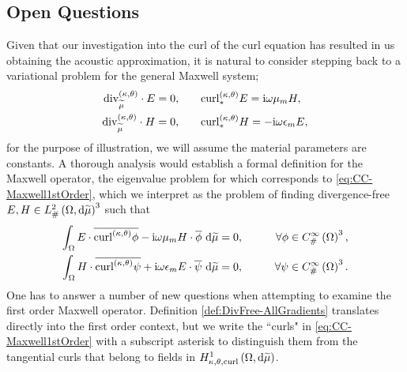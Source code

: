 \subsection{Open Questions} \label{ssec:CC-OpenQuestions}

Given that our investigation into the curl of the curl equation has resulted in us obtaining the acoustic approximation, it is natural to consider stepping back to a variational problem for the general Maxwell system;
\begin{subequations} \label{eq:CC-Maxwell1stOrder}
	\begin{align}
		\mathrm{div}_{\widetilde{\mu}}^{\left( \kappa, \theta \right)}\cdot E = 0,
		&\qquad
		\mathrm{curl}_{*}^{\left( \kappa, \theta \right)}E = \mathrm{i}\omega\mu_m H, \\
		\mathrm{div}_{\widetilde{\mu}}^{\left( \kappa, \theta \right)}\cdot H = 0,
		&\qquad
		\mathrm{curl}_{*}^{\left( \kappa, \theta \right)}H = -\mathrm{i}\omega\epsilon_m E,
	\end{align}
\end{subequations}
for the purpose of illustration, we will assume the material parameters are constants. 
A thorough analysis would establish a formal definition for the Maxwell operator, the eigenvalue problem for which corresponds to \eqref{eq:CC-Maxwell1stOrder}, which we interpret as the problem of finding divergence-free $E,H\in L^2_{\#}\left( \Omega,\mathrm{d} \widetilde{\mu} \right)^3$ such that
\begin{subequations} \label{eq:CC-Maxwell1stOrderVariational}
	\begin{align} 
		\int_{\Omega} E\cdot\overline{\mathrm{curl}_{}^{\left( \kappa, \theta \right)}\phi} - \mathrm{i}\omega\mu_m H\cdot\overline{\phi}  \ \mathrm{d}\widetilde{\mu} &= 0, 
		\qquad &\forall \phi\in C^{\infty}_{\#}\left( \Omega \right)^3, \\
		\int_{\Omega} H\cdot\overline{\mathrm{curl}_{}^{\left( \kappa, \theta \right)}\psi} + \mathrm{i}\omega\epsilon_m E\cdot\overline{\psi}  \ \mathrm{d}\widetilde{\mu} &= 0,
		\qquad &\forall \psi\in C^{\infty}_{\#}\left( \Omega \right)^3.
	\end{align}
\end{subequations}
One has to answer a number of new questions when attempting to examine the first order Maxwell operator.
Definition \ref{def:DivFree-AllGradients} translates directly into the first order context, but we write the ``curls" in \eqref{eq:CC-Maxwell1stOrder} with a subscript asterisk to distinguish them from the tangential curls that belong to fields in $H^1_{\kappa,\theta,\mathrm{curl}}\left( \Omega, \mathrm{d}\widetilde{\mu} \right)$.
